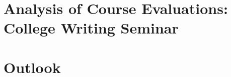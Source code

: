 \documentclass[../../main.tex]{subfiles}
\begin{document}
\begin{flushleft}

\end{flushleft}

\section{Analysis of Course Evaluations: College Writing Seminar}
\label{sec:writing_eval}

%

\begin{flushleft}

\end{flushleft}

\section{Outlook}
\label{sec:outlook}

%

\begin{flushleft}

\end{flushleft}
\end{document}
